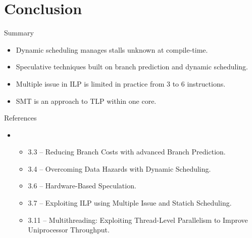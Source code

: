 \section{Conclusion}

\begin{frame}[t]{Summary}
\begin{itemize}[<+->]
  \item Dynamic scheduling manages stalls unknown at compile-time.
  
  \item Speculative techniques built on branch prediction and dynamic scheduling.
  
  \item Multiple issue in ILP is limited in practice from 3 to 6 instructions.
  
  \item SMT is an approach to TLP within one core.
\end{itemize} 
\end{frame}


\begin{frame}[t]{References}
\begin{itemize}
  \item \bibhennessy
    \begin{itemize}
      \item 3.3 -- Reducing Branch Costs with advanced Branch Prediction.
      \item 3.4 -- Overcoming Data Hazards with Dynamic Scheduling.
      \item 3.6 -- Hardware-Based Speculation.
      \item 3.7 -- Exploiting ILP using Multiple Issue and Statich Scheduling.
      \item 3.11 -- Multithreading: Exploiting Thread-Level Parallelism to 
            Improve Uniprocessor Throughput.
    \end{itemize}
\end{itemize}
\end{frame}
